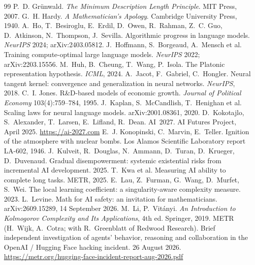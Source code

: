 \begin{thebibliography}{99}
 P.~D. Gr\"unwald. \emph{The Minimum Description Length Principle}. MIT Press, 2007.
 G.~H. Hardy. \emph{A Mathematician's Apology}. Cambridge University Press, 1940.
 A.~Ho, T.~Besiroglu, E.~Erdil, D.~Owen, R.~Rahman, Z.~C. Guo, D.~Atkinson, N.~Thompson, J.~Sevilla. Algorithmic progress in language models. \emph{NeurIPS} 2024; arXiv:2403.05812.
 J.~Hoffmann, S.~Borgeaud, A.~Mensch et al. Training compute-optimal large language models. \emph{NeurIPS} 2022; arXiv:2203.15556.
 M.~Huh, B.~Cheung, T.~Wang, P.~Isola. The Platonic representation hypothesis. \emph{ICML}, 2024.
 A.~Jacot, F.~Gabriel, C.~Hongler. Neural tangent kernel: convergence and generalization in neural networks. \emph{NeurIPS}, 2018.
 C.~I. Jones. R\&D-based models of economic growth. \emph{Journal of Political Economy} 103(4):759--784, 1995.
 J.~Kaplan, S.~McCandlish, T.~Henighan et al. Scaling laws for neural language models. arXiv:2001.08361, 2020.
 D.~Kokotajlo, S.~Alexander, T.~Larsen, E.~Lifland, R.~Dean. AI~2027. AI Futures Project, April 2025. \url{https://ai-2027.com}
 E.~J. Konopinski, C.~Marvin, E.~Teller. Ignition of the atmosphere with nuclear bombs. Los Alamos Scientific Laboratory report LA-602, 1946.
 J.~Kulveit, R.~Douglas, N.~Ammann, D.~Turan, D.~Krueger, D.~Duvenaud. Gradual disempowerment: systemic existential risks from incremental AI development. 2025.
 T.~Kwa et al. Measuring AI ability to complete long tasks. METR, 2025.
 E.~Lau, Z.~Furman, G.~Wang, D.~Murfet, S.~Wei. The local learning coefficient: a singularity-aware complexity measure. 2023.
 L.~Levine. Math for AI safety: an invitation for mathematicians. arXiv:2609.15289, 14 September 2026.
 M.~Li, P.~Vit\'anyi. \emph{An Introduction to Kolmogorov Complexity and Its Applications}, 4th ed. Springer, 2019.
 METR (H.~Wijk, A.~Cotra; with R.~Greenblatt of Redwood Research). Brief independent investigation of agents' behavior, reasoning and collaboration in the OpenAI / Hugging Face hacking incident. 26 August 2026. \url{https://metr.org/hugging-face-incident-report-aug-2026.pdf}

\end{thebibliography}
